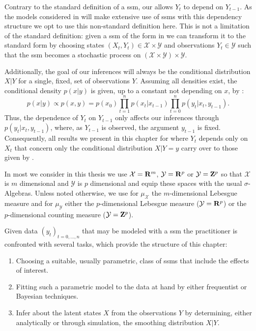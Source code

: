 \begin{remark}
    \label{rem:dependence_Yt-1}
    Contrary to the standard definition of a \gls{ssm}, our  allows $Y_t$ to depend on $Y_{t - 1}$.
    As the models considered in  will make extensive use of \glspl{ssm} with this dependency structure we opt to use this non-standard definition here.
    This is not a limitation of the standard definition: given a \gls{ssm} of the form in  we can transform it to the standard form by choosing states $(X_t, Y_t) \in \mathcal X \times \mathcal Y$ and observations $Y_t \in \mathcal Y$ such that the \gls{ssm} becomes a stochastic process on $ \left( \mathcal X \times \mathcal Y\right) \times \mathcal Y$.

    Additionally, the goal of our inferences will always be the conditional distribution $X|Y$ for a single, fixed, set of observations $Y$. Assuming all densities exist, the conditional density $p(x|y)$ is given, up to a constant not depending on $x$, by :
    $$
    p(x|y) \propto p(x,y) =p (x_0)\prod_{t = 1}^{n} p(x_{t}|x_{t - 1}) \prod_{t = 0}^{n} p(y_t | x_t, y_{t - 1}).
    $$
    Thus, the dependence of $Y_{t}$ on $Y_{t - 1}$ only affects our inferences through $p(y_{t} | x_{t}, y_{t - 1})$, where, as $Y_{t - 1}$ is observed, the argument $y_{t - 1}$ is fixed. 
    Consequently, all results we present in this chapter for  where $Y_{t}$ depends only on $X_{t}$ that concern only the conditional distribution $X|Y=y$ carry over to those given by . 

    In most  we consider in this thesis we use $\mathcal X = \mathbf R^m$, $\mathcal Y = \mathbf R^p$ or $\mathcal Y = \mathbf Z^p$ so that $\mathcal X$ is $m$ dimensional and $\mathcal Y$ is $p$ dimensional and equip these spaces with the usual $\sigma$-Algebras. Unless noted otherwise, we use for $\mu_{\mathcal X}$ the $m$-dimensional Lebesgue measure and for $\mu_{\mathcal Y}$ either the $p$-dimensional Lebesgue measure ($\mathcal Y = \mathbf R^{p}$) or the $p$-dimensional counting measure ($\mathcal Y = \mathbf Z^{p}$).
\end{remark}

Given data $(y_t)_{t = 0, \dots, n}$ that may be modeled with a \gls{ssm} the practitioner is confronted with several tasks, which provide the structure of this chapter:

\begin{enumerate}
    \item\label{it:model_choice} Choosing a suitable, usually parametric, class of \glspl{ssm} that include the effects of interest.
    \item\label{it:model_fitting} Fitting such a parametric model to the data at hand by either frequentist or Bayesian techniques.
    \item\label{it:smoothing_problem} Infer about the latent states $X$ from the observations $Y$ by determining, either analytically or through simulation, the smoothing distribution $X|Y$.
\end{enumerate}

